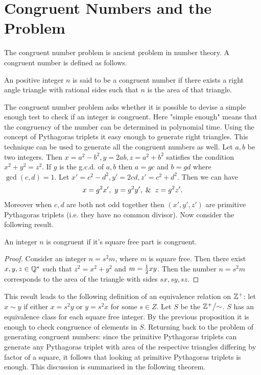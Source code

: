 \section{Congruent Numbers and the Problem}
The congruent number problem is ancient problem in number theory. A congruent number is defined as follows.
\begin{definition}
  An positive integer $n$ is said to be a congruent number if there exists a right angle triangle with rational sides such that $n$ is the area of that triangle. 
\end{definition}
The congruent number problem asks whether it is possible to devise a simple enough test to check if an integer is congruent. Here "simple enough" means that the congruency of the number can be determined in polynomial time. Using the concept of Pythagoras triplets it easy enough to generate right triangles. This technique can be used to generate all the congruent numbers as well. Let $a,b$ be two integers. Then $x = a^2-b^2, y = 2ab, z = a^2+b^2$ satisfies the condition $x^2+y^2 = z^2$. If $g$ is the g.c.d. of $a,b$ then $a = gc$ and $b = gd$ where $\gcd(c,d) = 1$. Let $x' = c^2 - d^2, y' = 2cd, z' = c^2+d^2$. Then we can have
\begin{align*}
  x = g^2x',\ y = g^2 y',\And z = g^2z'.
\end{align*}
Moreover when $c,d$ are both not odd together then $(x',y',z')$ are primitive Pythagoras triplets (i.e. they have no common divisor). Now consider the following result.
\begin{proposition}
  An integer $n$ is congruent if it's square free part is congruent.
\end{proposition}
\begin{proof}
  Consider an integer $n = s^2m$, where $m$ is square free. Then there exist $x,y,z\in \mathbb{Q}^*$ such that $z^2 = x^2 + y^2$ and $m = \frac{1}{2}xy$. Then the number $n = s^2m$ corresponds to the area of the triangle with sides $sx, sy, sz$.
\end{proof}
This result leads to the following definition of an equivalence relation on $\mathbb{Z}^+$: let $x\sim y$ if either $x = s^2y$ or $y = s^2 x$ for some $s\in Z$. Let $S$ be the $\Z^+\bign/ \sim$. $S$ has an equivalence class for each square free integer. By the previous proposition it is enough to check congruence of elements in $S$. Returning back to the problem of generating congruent numbers: since the primitive Pythagoras triplets can generate any Pythagoras triplet with area of the respective triangles differing by factor of a square, it follows that looking at primitive Pythagoras triplets is enough. This discussion is summarised in the following theorem.
